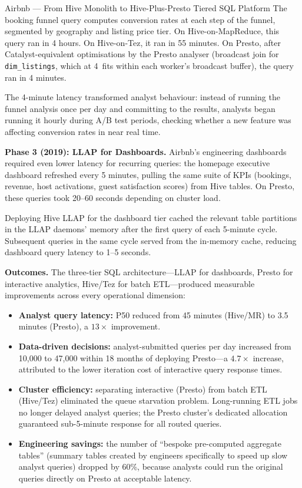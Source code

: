 \begin{casestudy}{Airbnb --- From Hive Monolith to Hive-Plus-Presto Tiered SQL Platform}
The booking funnel query computes conversion rates at each step of the
funnel, segmented by geography and listing price tier. On Hive-on-MapReduce,
this query ran in 4 hours. On Hive-on-Tez, it ran in 55 minutes. On
Presto, after Catalyst-equivalent optimisations by the Presto analyser
(broadcast join for \texttt{dim\_listings}, which at 4\GB\ fits within
each worker's broadcast buffer), the query ran in 4 minutes.

The 4-minute latency transformed analyst behaviour: instead of running
the funnel analysis once per day and committing to the results, analysts
began running it hourly during A/B test periods, checking whether a new
feature was affecting conversion rates in near real time.

\smallskip
\textbf{Phase 3 (2019): LLAP for Dashboards.}
Airbnb's engineering dashboards required even lower latency for
recurring queries: the homepage executive dashboard refreshed every
5 minutes, pulling the same suite of KPIs (bookings, revenue, host
activations, guest satisfaction scores) from Hive tables. On Presto,
these queries took 20--60 seconds depending on cluster load.

Deploying Hive LLAP for the dashboard tier cached the relevant table
partitions in the LLAP daemons' memory after the first query of each
5-minute cycle. Subsequent queries in the same cycle served from the
in-memory cache, reducing dashboard query latency to 1--5 seconds.

\smallskip
\textbf{Outcomes.}
The three-tier SQL architecture---LLAP for dashboards, Presto for
interactive analytics, Hive/Tez for batch ETL---produced measurable
improvements across every operational dimension:

\begin{itemize}
  \item \textbf{Analyst query latency:} P50 reduced from 45 minutes
        (Hive/MR) to 3.5 minutes (Presto), a $13\times$ improvement.
  \item \textbf{Data-driven decisions:} analyst-submitted queries per day
        increased from 10{,}000 to 47{,}000 within 18 months of
        deploying Presto---a $4.7\times$ increase, attributed to the
        lower iteration cost of interactive query response times.
  \item \textbf{Cluster efficiency:} separating interactive (Presto)
        from batch ETL (Hive/Tez) eliminated the queue starvation
        problem. Long-running ETL jobs no longer delayed analyst queries;
        the Presto cluster's dedicated allocation guaranteed
        sub-5-minute response for all routed queries.
  \item \textbf{Engineering savings:} the number of ``bespoke
        pre-computed aggregate tables'' (summary tables created by
        engineers specifically to speed up slow analyst queries)
        dropped by 60\%, because analysts could run the original
        queries directly on Presto at acceptable latency.
\end{itemize}


\end{casestudy}
